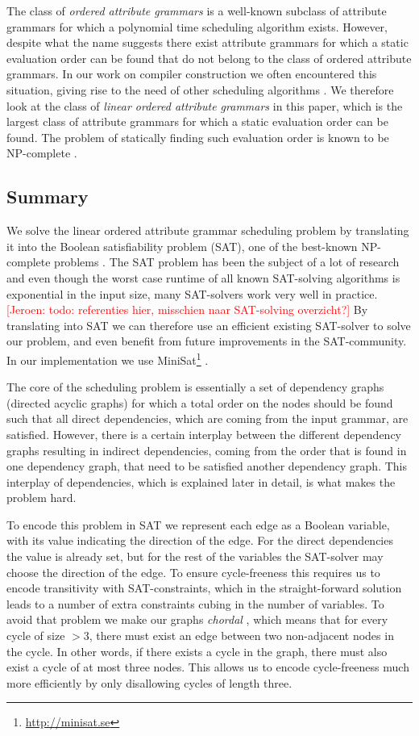 \documentclass{llncs}
\newif\iffinal\finalfalse
\newcommand{\REM}[3]{\iffinal\else\textcolor{#2}{[#1: #3]}\fi}
\newcommand{\Jeroen}[1]{\REM{Jeroen}{red}{#1}}
\begin{document}
The class of \emph{ordered attribute grammars} \cite{kastens80} is a well-known subclass of attribute grammars for which a polynomial time scheduling algorithm exists. However, despite what the name suggests there exist attribute grammars for which a static evaluation order can be found that do not belong to the class of ordered attribute grammars. In our work on compiler construction we often encountered this situation, giving rise to the need of other scheduling algorithms \cite{bransen2012,Binsbergen:2015}. We therefore look at the class of \emph{linear ordered attribute grammars} in this paper, which is the largest class of attribute grammars for which a static evaluation order can be found. The problem of statically finding such evaluation order is known to be NP-complete \cite{engelfriet82}.

\subsection{Summary}
We solve the linear ordered attribute grammar scheduling problem by translating it into the Boolean satisfiability problem (SAT), one of the best-known NP-complete problems \cite{Cook:1971}. The SAT problem has been the subject of a lot of research and even though the worst case runtime of all known SAT-solving algorithms is exponential in the input size, many SAT-solvers work very well in practice. \Jeroen{todo: referenties hier, misschien naar SAT-solving overzicht?} By translating into SAT we can therefore use an efficient existing SAT-solver to solve our problem, and even benefit from future improvements in the SAT-community. In our implementation we use MiniSat\footnote{\url{http://minisat.se}} \cite{Een:2004}.

The core of the scheduling problem is essentially a set of dependency graphs (directed acyclic graphs) for which a total order on the nodes should be found such that all direct dependencies, which are coming from the input grammar, are satisfied. However, there is a certain interplay between the different dependency graphs resulting in indirect dependencies, coming from the order that is found in one dependency graph, that need to be satisfied another dependency graph. This interplay of dependencies, which is explained later in detail, is what makes the problem hard.

To encode this problem in SAT we represent each edge as a Boolean variable, with its value indicating the direction of the edge. For the direct dependencies the value is already set, but for the rest of the variables the SAT-solver may choose the direction of the edge. To ensure cycle-freeness this requires us to encode transitivity with SAT-constraints, which in the straight-forward solution leads to a number of extra constraints cubing in the number of variables. To avoid that problem we make our graphs \emph{chordal} \cite{Dirac:1961}, which means that for every cycle of size $> 3$, there must exist an edge between two non-adjacent nodes in the cycle. In other words, if there exists a cycle in the graph, there must also exist a cycle of at most three nodes. This allows us to encode cycle-freeness much more efficiently by only disallowing cycles of length three.
\end{document}
